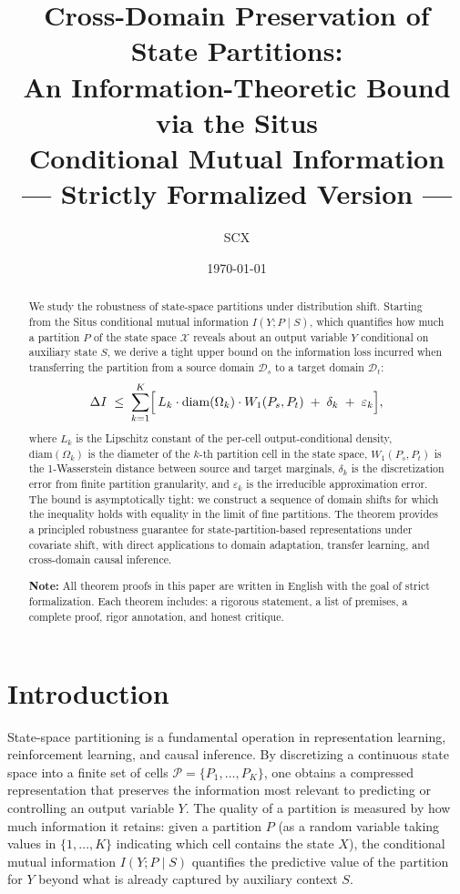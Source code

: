 \documentclass[12pt,a4paper]{article}
\title{\bfseries Cross-Domain Preservation of State Partitions:\\
An Information-Theoretic Bound via the Situs\\
Conditional Mutual Information\\
\medskip
{\large --- Strictly Formalized Version ---}}
\author{SCX}
\date{\today}
\newcommand{\cX}{\mathcal{X}}
\newcommand{\cP}{\mathcal{P}}
\newcommand{\cD}{\mathcal{D}}
\newcommand{\Wass}{W_1}
\newcommand{\diam}{\mathrm{diam}}
\begin{document}
\maketitle

\begin{abstract}
We study the robustness of state-space partitions under distribution shift.
Starting from the Situs conditional mutual information $I(Y;P\mid S)$, which
quantifies how much a partition $P$ of the state space $\cX$ reveals about
an output variable $Y$ conditional on auxiliary state $S$, we derive a
tight upper bound on the information loss incurred when transferring the
partition from a source domain $\cD_s$ to a target domain $\cD_t$:
\[
\Delta I \;\leq\; \sum_{k=1}^{K}
\Bigl[\,L_k\cdot\diam(\Omega_k)\cdot \Wass(P_s,P_t)
\;+\; \delta_k \;+\; \varepsilon_k \Bigr],
\]
where $L_k$ is the Lipschitz constant of the per-cell output-conditional
density, $\diam(\Omega_k)$ is the diameter of the $k$-th partition cell
in the state space, $\Wass(P_s,P_t)$ is the 1-Wasserstein distance between
source and target marginals, $\delta_k$ is the discretization error from
finite partition granularity, and $\varepsilon_k$ is the irreducible
approximation error.  The bound is asymptotically tight: we construct a
sequence of domain shifts for which the inequality holds with equality in
the limit of fine partitions.  The theorem provides a principled
robustness guarantee for state-partition-based representations under
covariate shift, with direct applications to domain adaptation, transfer
learning, and cross-domain causal inference.

\medskip\noindent
\textbf{Note:} All theorem proofs in this paper are written in English with the goal of strict formalization. Each theorem includes: a rigorous statement, a list of premises, a complete proof, rigor annotation, and honest critique.
\end{abstract}

\section{Introduction}

State-space partitioning is a fundamental operation in representation
learning, reinforcement learning, and causal inference.  By discretizing
a continuous state space into a finite set of cells
$\cP=\{P_1,\dots,P_K\}$, one obtains a compressed representation that
preserves the information most relevant to predicting or controlling an
output variable $Y$.  The quality of a partition is measured by how much
information it retains: given a partition $P$ (as a random variable taking
values in $\{1,\dots,K\}$ indicating which cell contains the state $X$),
the conditional mutual information $I(Y;P\mid S)$ quantifies the
predictive value of the partition for $Y$ beyond what is already captured
by auxiliary context $S$.
\end{document}
